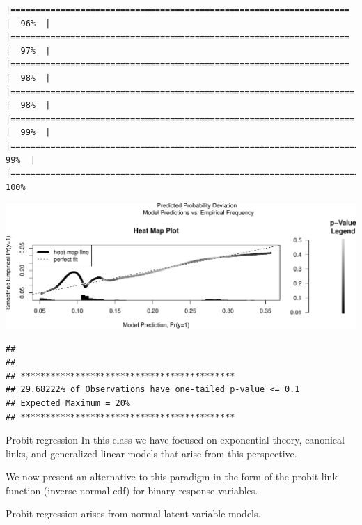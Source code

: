 \documentclass[
  ignorenonframetext,
]{beamer}
\begin{document}
\begin{frame}[fragile]{}
\begin{verbatim}
|====================================================================  |  96%  |                                                                              |====================================================================  |  97%  |                                                                              |====================================================================  |  98%  |                                                                              |===================================================================== |  98%  |                                                                              |===================================================================== |  99%  |                                                                              |======================================================================|  99%  |                                                                              |======================================================================| 100%
\end{verbatim}

\includegraphics{week4_p1_files/figure-beamer/heatmap2-1.pdf}

\begin{verbatim}
## 
##  
## ******************************************* 
## 29.68222% of Observations have one-tailed p-value <= 0.1
## Expected Maximum = 20% 
## *******************************************
\end{verbatim}
\end{frame}

\begin{frame}{Probit regression}
\protect\hypertarget{probit-regression}{}
In this class we have focused on exponential theory, canonical links,
and generalized linear models that arise from this perspective.

\vspace{12pt}

We now present an alternative to this paradigm in the form of the probit
link function (inverse normal cdf) for binary response variables.

\vspace{12pt}

Probit regression arises from normal latent variable models.
\end{frame}
\end{document}
